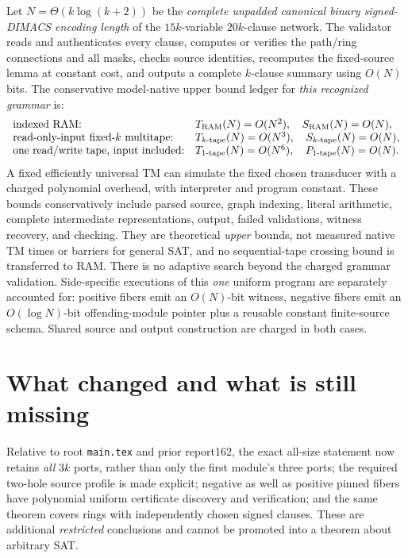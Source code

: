\documentclass[11pt]{article}
\begin{document}
Let $N=\Theta(k\log(k+2))$ be the \emph{complete unpadded canonical binary signed-DIMACS encoding length} of the $15k$-variable $20k$-clause network. The validator reads and authenticates every clause, computes or verifies the path/ring connections and all masks, checks source identities, recomputes the fixed-source lemma at constant cost, and outputs a complete $k$-clause summary using $O(N)$ bits. The conservative model-native upper bound ledger for \emph{this recognized grammar} is:
\[
\begin{array}{ll}
\text{indexed RAM:}&T_{\rm RAM}(N)=O(N^2),\quad S_{\rm RAM}(N)=O(N),\\
\text{read-only-input fixed-}k\text{ multitape:}&T_{k\text{-tape}}(N)=O(N^3),\quad S_{k\text{-tape}}(N)=O(N),\\
\text{one read/write tape, input included:}&T_{1\text{-tape}}(N)=O(N^6),\quad P_{1\text{-tape}}(N)=O(N).
\end{array}
\]
A fixed efficiently universal TM can simulate the fixed chosen transducer with a charged polynomial overhead, with interpreter and program constant. These bounds conservatively include parsed source, graph indexing, literal arithmetic, complete intermediate representations, output, failed validations, witness recovery, and checking. They are theoretical \emph{upper} bounds, not measured native TM times or barriers for general SAT, and no sequential-tape crossing bound is transferred to RAM. There is no adaptive search beyond the charged grammar validation. Side-specific executions of this \emph{one} uniform program are separately accounted for: positive fibers emit an $O(N)$-bit witness, negative fibers emit an $O(\log N)$-bit offending-module pointer plus a reusable constant finite-source schema. Shared source and output construction are charged in both cases.

\section{What changed and what is still missing}
Relative to root \texttt{main.tex} and prior report162, the exact all-size statement now retains \emph{all} $3k$ ports, rather than only the first module's three ports; the required two-hole source profile is made explicit; negative as well as positive pinned fibers have polynomial uniform certificate discovery and verification; and the same theorem covers rings with independently chosen signed clauses. These are additional \emph{restricted} conclusions and cannot be promoted into a theorem about arbitrary SAT.
\end{document}
